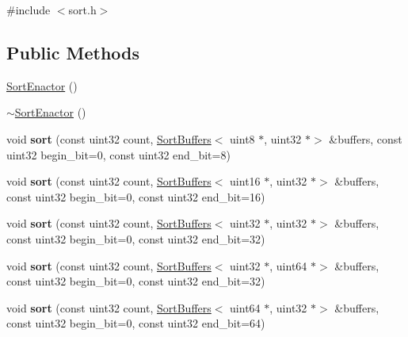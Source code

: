 {\ttfamily \#include $<$sort.\+h$>$}

\subsection*{Public Methods}
\begin{DoxyCompactItemize}
\item 
\hyperlink{structcugar_1_1cuda_1_1_sort_enactor_ac1aed4c8b9362ca5e349bd4b0fbd4c18}{Sort\+Enactor} ()
\item 
\hyperlink{structcugar_1_1cuda_1_1_sort_enactor_abf18529a97f46aefeea4c9056118e6bf}{$\sim$\+Sort\+Enactor} ()
\item 
\mbox{\label{structcugar_1_1cuda_1_1_sort_enactor_ad1a1f71ceab48b96a080bed38713358e}} 
void {\bfseries sort} (const uint32 count, \hyperlink{structcugar_1_1cuda_1_1_sort_buffers}{Sort\+Buffers}$<$ uint8 $\ast$, uint32 $\ast$$>$ \&buffers, const uint32 begin\+\_\+bit=0, const uint32 end\+\_\+bit=8)
\item 
\mbox{\label{structcugar_1_1cuda_1_1_sort_enactor_ac80590f55902fe181d294a3b49d739b8}} 
void {\bfseries sort} (const uint32 count, \hyperlink{structcugar_1_1cuda_1_1_sort_buffers}{Sort\+Buffers}$<$ uint16 $\ast$, uint32 $\ast$$>$ \&buffers, const uint32 begin\+\_\+bit=0, const uint32 end\+\_\+bit=16)
\item 
\mbox{\label{structcugar_1_1cuda_1_1_sort_enactor_a57191614b996f83a9a459608bcd85bc2}} 
void {\bfseries sort} (const uint32 count, \hyperlink{structcugar_1_1cuda_1_1_sort_buffers}{Sort\+Buffers}$<$ uint32 $\ast$, uint32 $\ast$$>$ \&buffers, const uint32 begin\+\_\+bit=0, const uint32 end\+\_\+bit=32)
\item 
\mbox{\label{structcugar_1_1cuda_1_1_sort_enactor_a591352f52421ab697cabe195460636be}} 
void {\bfseries sort} (const uint32 count, \hyperlink{structcugar_1_1cuda_1_1_sort_buffers}{Sort\+Buffers}$<$ uint32 $\ast$, uint64 $\ast$$>$ \&buffers, const uint32 begin\+\_\+bit=0, const uint32 end\+\_\+bit=32)
\item 
\mbox{\label{structcugar_1_1cuda_1_1_sort_enactor_a77c4af32cc1bcade4353704c27c28b53}} 
void {\bfseries sort} (const uint32 count, \hyperlink{structcugar_1_1cuda_1_1_sort_buffers}{Sort\+Buffers}$<$ uint64 $\ast$, uint32 $\ast$$>$ \&buffers, const uint32 begin\+\_\+bit=0, const uint32 end\+\_\+bit=64)
$$
\end{DoxyCompactItemize}
